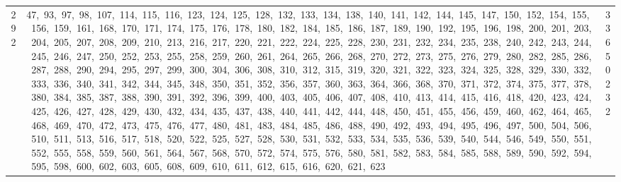 \begin{longtable}{c|p{}|r}
292 & 47,\ 93,\ 97,\ 98,\ 107,\ 114,\ 115,\ 116,\ 123,\ 124,\ 125,\ 128,\ 132,\ 133,\ 134,\ 138,\ 140,\ 141,\ 142,\ 144,\ 145,\ 147,\ 150,\ 152,\ 154,\ 155,\ 156,\ 159,\ 161,\ 168,\ 170,\ 171,\ 174,\ 175,\ 176,\ 178,\ 180,\ 182,\ 184,\ 185,\ 186,\ 187,\ 189,\ 190,\ 192,\ 195,\ 196,\ 198,\ 200,\ 201,\ 203,\ 204,\ 205,\ 207,\ 208,\ 209,\ 210,\ 213,\ 216,\ 217,\ 220,\ 221,\ 222,\ 224,\ 225,\ 228,\ 230,\ 231,\ 232,\ 234,\ 235,\ 238,\ 240,\ 242,\ 243,\ 244,\ 245,\ 246,\ 247,\ 250,\ 252,\ 253,\ 255,\ 258,\ 259,\ 260,\ 261,\ 264,\ 265,\ 266,\ 268,\ 270,\ 272,\ 273,\ 275,\ 276,\ 279,\ 280,\ 282,\ 285,\ 286,\ 287,\ 288,\ 290,\ 294,\ 295,\ 297,\ 299,\ 300,\ 304,\ 306,\ 308,\ 310,\ 312,\ 315,\ 319,\ 320,\ 321,\ 322,\ 323,\ 324,\ 325,\ 328,\ 329,\ 330,\ 332,\ 333,\ 336,\ 340,\ 341,\ 342,\ 344,\ 345,\ 348,\ 350,\ 351,\ 352,\ 356,\ 357,\ 360,\ 363,\ 364,\ 366,\ 368,\ 370,\ 371,\ 372,\ 374,\ 375,\ 377,\ 378,\ 380,\ 384,\ 385,\ 387,\ 388,\ 390,\ 391,\ 392,\ 396,\ 399,\ 400,\ 403,\ 405,\ 406,\ 407,\ 408,\ 410,\ 413,\ 414,\ 415,\ 416,\ 418,\ 420,\ 423,\ 424,\ 425,\ 426,\ 427,\ 428,\ 429,\ 430,\ 432,\ 434,\ 435,\ 437,\ 438,\ 440,\ 441,\ 442,\ 444,\ 448,\ 450,\ 451,\ 455,\ 456,\ 459,\ 460,\ 462,\ 464,\ 465,\ 468,\ 469,\ 470,\ 472,\ 473,\ 475,\ 476,\ 477,\ 480,\ 481,\ 483,\ 484,\ 485,\ 486,\ 488,\ 490,\ 492,\ 493,\ 494,\ 495,\ 496,\ 497,\ 500,\ 504,\ 506,\ 510,\ 511,\ 513,\ 516,\ 517,\ 518,\ 520,\ 522,\ 525,\ 527,\ 528,\ 530,\ 531,\ 532,\ 533,\ 534,\ 535,\ 536,\ 539,\ 540,\ 544,\ 546,\ 549,\ 550,\ 551,\ 552,\ 555,\ 558,\ 559,\ 560,\ 561,\ 564,\ 567,\ 568,\ 570,\ 572,\ 574,\ 575,\ 576,\ 580,\ 581,\ 582,\ 583,\ 584,\ 585,\ 588,\ 589,\ 590,\ 592,\ 594,\ 595,\ 598,\ 600,\ 602,\ 603,\ 605,\ 608,\ 609,\ 610,\ 611,\ 612,\ 615,\ 616,\ 620,\ 621,\ 623 & 33650232 \\

\end{longtable}
